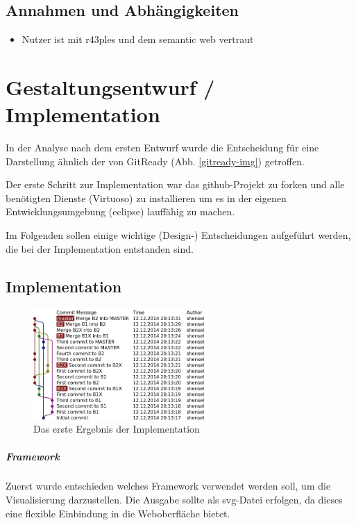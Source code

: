 \documentclass[color, ddc]{tudscrreprt}
\begin{document}
\section{Annahmen und Abhängigkeiten}
\begin{itemize}
\item Nutzer ist mit r43ples und dem semantic web vertraut
\end{itemize}

\chapter{Gestaltungsentwurf / Implementation}

In der Analyse nach dem ersten Entwurf wurde die Entscheidung für eine Darstellung ähnlich der von GitReady (Abb. \ref{gitready-img}) getroffen.

Der erste Schritt zur Implementation war das github-Projekt zu forken und alle benötigten Dienste (Virtuoso) zu installieren um es in der eigenen Entwicklungsumgebung (eclipse) lauffähig zu machen.

Im Folgenden sollen einige wichtige (Design-) Entscheidungen aufgeführt werden, die bei der Implementation entstanden sind.

\section{Implementation}

\begin{figure}[ht!]
\centering
\includegraphics[width=0.6\textwidth]{Skizzen/revisiongraph.png}
\caption{Das erste Ergebnis der Implementation}
\label{implementation-img}
\end{figure}

\paragraph{Framework}
Zuerst wurde entschieden welches Framework verwendet werden soll, um die Visualisierung darzustellen. Die Ausgabe sollte als svg-Datei erfolgen, da dieses eine flexible Einbindung in die Weboberfläche bietet.
\end{document}
